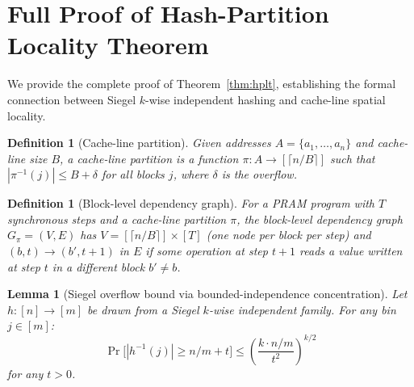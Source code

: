 \documentclass[11pt]{article}
\newtheorem{lemma}[theorem]{Lemma}
\newtheorem{definition}[theorem]{Definition}
\begin{document}
\appendix

\section{Full Proof of Hash-Partition Locality Theorem}
\label{app:proofs}

We provide the complete proof of Theorem~\ref{thm:hplt}, establishing the
formal connection between Siegel $k$-wise independent hashing and cache-line
spatial locality.

\begin{definition}[Cache-line partition]
Given addresses $A = \{a_1, \ldots, a_n\}$ and cache-line size $B$, a
\emph{cache-line partition} is a function $\pi: A \to [\lceil n/B \rceil]$
such that $|\pi^{-1}(j)| \le B + \delta$ for all blocks $j$, where
$\delta$ is the \emph{overflow}.
\end{definition}

\begin{definition}[Block-level dependency graph]
For a PRAM program with $T$ synchronous steps and a cache-line partition
$\pi$, the \emph{block-level dependency graph} $G_\pi = (V, E)$ has
$V = [\lceil n/B \rceil] \times [T]$ (one node per block per step) and
$(b, t) \to (b', t+1)$ in $E$ if some operation at step $t+1$ reads a value
written at step $t$ in a different block $b' \ne b$.
\end{definition}

\begin{lemma}[Siegel overflow bound via bounded-independence concentration]
\label{lem:siegel_overflow}
Let $h: [n] \to [m]$ be drawn from a Siegel $k$-wise independent family.
For any bin $j \in [m]$:
\[
  \Pr\bigl[|h^{-1}(j)| \ge n/m + t\bigr] \le \left(\frac{k \cdot n/m}{t^2}\right)^{k/2}
\]
for any $t > 0$.
\end{lemma}
\end{document}
